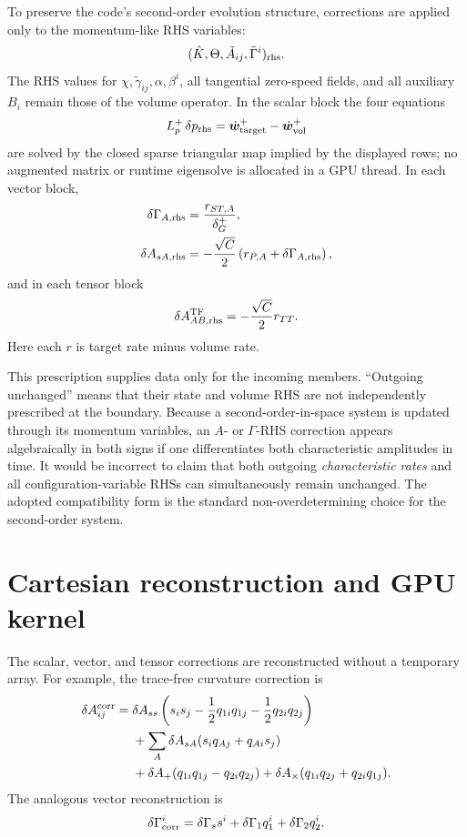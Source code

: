 \documentclass[11pt]{article}
\newcommand{\tf}{\mathrm{TF}}
\begin{document}
To preserve the code's second-order evolution structure, corrections are
applied only to the momentum-like RHS variables:
\[
 (\hat K,\Theta,\tilde A_{ij},\tilde\Gamma^i)_{\rm rhs}.
\]
The RHS values for \(\chi,\tilde\gamma_{ij},\alpha,\beta^i\), all tangential
zero-speed fields, and all auxiliary \(B_i\) remain those of the volume
operator.  In the scalar block the four equations
\[
 L_p^+\,\delta p_{\rm rhs}
 =\dot{\bm w}_{\rm target}^+-\dot{\bm w}_{\rm vol}^+
\]
are solved by the closed sparse triangular map implied by the displayed rows;
no augmented matrix or runtime eigensolve is allocated in a GPU thread.  In
each vector block,
\begin{align}
 \delta\Gamma_{A,\rm rhs}
   &=\frac{r_{ST,A}}{\delta_G^+},\\
 \delta A_{sA,\rm rhs}
   &=-\frac{\sqrt C}{2}
       \left(r_{P,A}+\delta\Gamma_{A,\rm rhs}\right),
\end{align}
and in each tensor block
\[
 \delta A_{AB,\rm rhs}^{\tf}
   =-\frac{\sqrt C}{2}r_{TT}.
\]
Here each \(r\) is target rate minus volume rate.

This prescription supplies data only for the incoming members.  ``Outgoing
unchanged'' means that their state and volume RHS are not independently
prescribed at the boundary.  Because a second-order-in-space system is updated
through its momentum variables, an \(A\)- or \(\Gamma\)-RHS correction appears
algebraically in both signs if one differentiates both characteristic
amplitudes in time.  It would be incorrect to claim that both outgoing
\emph{characteristic rates} and all configuration-variable RHSs can
simultaneously remain unchanged.  The adopted compatibility form is the
standard non-overdetermining choice for the second-order system.

\section{Cartesian reconstruction and GPU kernel}

The scalar, vector, and tensor corrections are reconstructed without a
temporary array.  For example, the trace-free curvature correction is
\begin{align}
 \delta A_{ij}^{\rm corr}
={}&\delta A_{ss}
 \left(s_i s_j-\frac12q_{1i}q_{1j}-\frac12q_{2i}q_{2j}\right)\\
&+\sum_A\delta A_{sA}(s_iq_{Aj}+q_{Ai}s_j)\\
&+\delta A_+
  (q_{1i}q_{1j}-q_{2i}q_{2j})
 +\delta A_\times(q_{1i}q_{2j}+q_{2i}q_{1j}).
\end{align}
The analogous vector reconstruction is
\[
 \delta\Gamma^i_{\rm corr}
 =\delta\Gamma_s s^i+\delta\Gamma_1q_1^i+\delta\Gamma_2q_2^i.
\]
\end{document}
